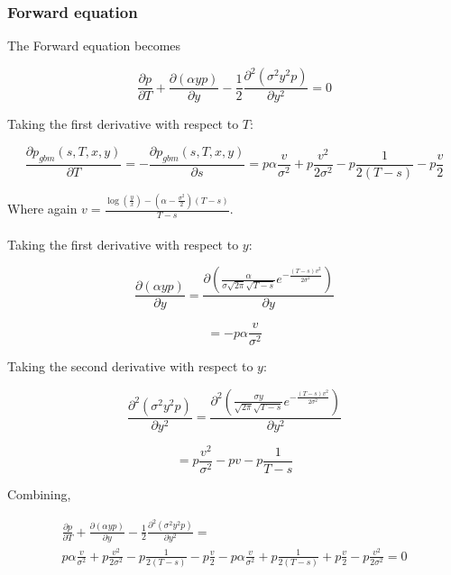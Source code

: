 \documentclass{article}
\theoremstyle{definition}
\begin{document}
\subsubsection{Forward equation}
The Forward equation becomes

\[\frac{\partial p} {\partial T}+\frac{\partial \left(\alpha y p\right)}{\partial y}-\frac{1}{2} \frac{\partial^2 \left(\sigma^2 y^2 p\right)}{\partial y^2} =0 \]

Taking the first derivative with respect to \(T\):

\[\frac{\partial p_{gbm}(s, T, x, y)}{\partial T}=  -\frac{\partial p_{gbm}(s, T, x, y)}{\partial s} = p \alpha \frac{v}{\sigma^2} + p\frac{v^2}{2\sigma^2}- p\frac{1}{2(T-s)}- p\frac{v}{2}    \]

Where again \(v=\frac{ \log\left(\frac{y}{x}\right) -\left(\alpha-\frac{\sigma^2}{2}\right)(T-s)}{T-s}\).
\\
\\
Taking the first derivative with respect to \(y\):

\[\frac{\partial \left(\alpha y p\right)}{\partial y}= \frac{\partial \left(\frac{\alpha}{\sigma \sqrt{2\pi} \sqrt{T-s} } e^{-\frac{(T-s)v^2}{2\sigma^2}}\right)}{\partial y} \]

\[=-p\alpha\frac{v }{\sigma^2}\]

Taking the second derivative with respect to \(y\):

\[\frac{\partial^2 \left(\sigma^2 y^2 p\right)}{\partial y^2}=\frac{\partial^2 \left(\frac{\sigma y }{\sqrt{2\pi} \sqrt{T-s} } e^{-\frac{(T-s)v^2}{2\sigma^2}}\right)}{\partial y^2} \]

\[=p\frac{v^2}{\sigma^2} -p v-p \frac{1}{T-s} \]

Combining, 

\begin{multline*} \frac{\partial p} {\partial T}+\frac{\partial \left(\alpha y p\right)}{\partial y}-\frac{1}{2} \frac{\partial^2 \left(\sigma^2 y^2 p\right)}{\partial y^2}= \\p \alpha \frac{v}{\sigma^2} + p\frac{v^2}{2\sigma^2}- p\frac{1}{2(T-s)}- p\frac{v}{2}- p\alpha\frac{v }{\sigma^2} +  p \frac{1}{2(T-s)} +p \frac{v}{2}- p\frac{v^2}{2\sigma^2}=0\end{multline*}
\end{document}
